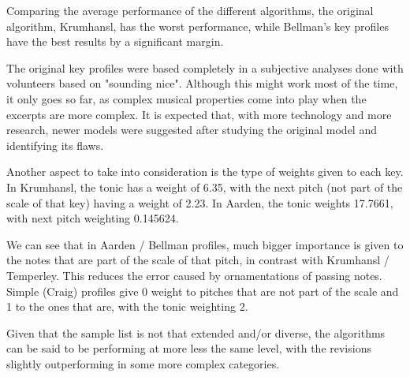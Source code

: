 Comparing the average performance of the different algorithms, the original algorithm, Krumhansl, has the worst performance,
while Bellman's key profiles have the best results by a significant margin.

The original key profiles were based completely in a subjective analyses done with volunteers based on "sounding nice".
Although this might work most of the time, it only goes so far, as complex musical properties come into play when the excerpts are more complex.
It is expected that, with more technology and more research, newer models were suggested after studying the original model and identifying its flaws.

Another aspect to take into consideration is the type of weights given to each key.
In Krumhansl, the tonic has a weight of 6.35, with the next pitch (not part of the scale of that key) having a weight of 2.23.
In Aarden, the tonic weights 17.7661, with next pitch weighting 0.145624.

We can see that in Aarden / Bellman profiles, much bigger importance is given to the notes that are part of the scale of that pitch, in contrast with Krumhansl / Temperley.
This reduces the error caused by ornamentations of passing notes.
Simple (Craig) profiles give 0 weight to pitches that are not part of the scale and 1 to the ones that are, with the tonic weighting 2.

Given that the sample list is not that extended and/or diverse, the algorithms can be said to be performing at more less the same level,
with the revisions slightly outperforming in some more complex categories.